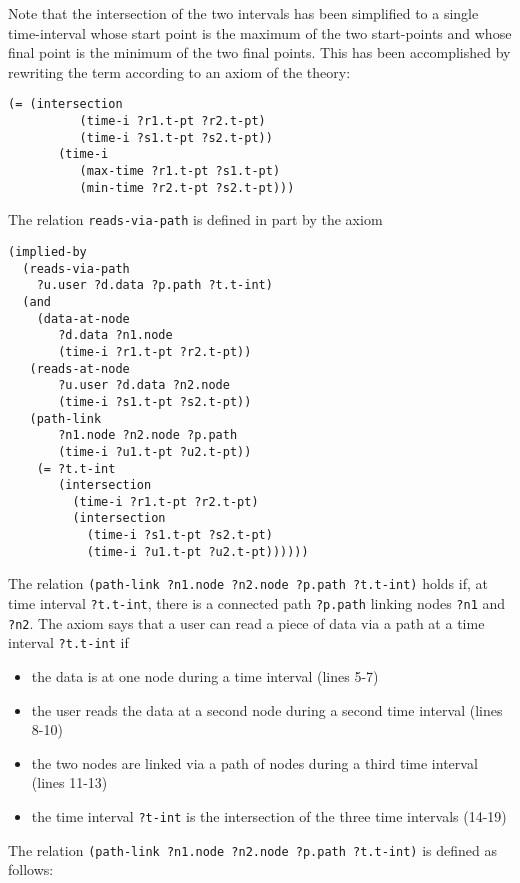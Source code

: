 Note that the intersection of the two intervals has been simplified to a single time-interval whose start point is the maximum of the two start-points and whose final point is the minimum of the two final points.  
This has been accomplished by rewriting the term according to an axiom of the theory:

\begin{lstlisting}[numbers=none]
 (= (intersection
          (time-i ?r1.t-pt ?r2.t-pt)
          (time-i ?s1.t-pt ?s2.t-pt))
       (time-i
          (max-time ?r1.t-pt ?s1.t-pt)
          (min-time ?r2.t-pt ?s2.t-pt)))
\end{lstlisting}


The relation \verb'reads-via-path' is defined in part by the axiom

\begin{lstlisting}
(implied-by
  (reads-via-path
    ?u.user ?d.data ?p.path ?t.t-int)
  (and
    (data-at-node 
       ?d.data ?n1.node 
       (time-i ?r1.t-pt ?r2.t-pt))
   (reads-at-node 
       ?u.user ?d.data ?n2.node 
       (time-i ?s1.t-pt ?s2.t-pt))
   (path-link 
       ?n1.node ?n2.node ?p.path 
       (time-i ?u1.t-pt ?u2.t-pt))   
    (= ?t.t-int
       (intersection
	     (time-i ?r1.t-pt ?r2.t-pt)
	     (intersection
           (time-i ?s1.t-pt ?s2.t-pt)
           (time-i ?u1.t-pt ?u2.t-pt))))))
\end{lstlisting}

The relation \verb'(path-link ?n1.node ?n2.node ?p.path ?t.t-int)' holds if, at time interval \verb'?t.t-int', there is a connected path \verb'?p.path' linking nodes \verb'?n1' and \verb'?n2'. 
The axiom says that a user can read a piece of data via a path at a time interval \verb'?t.t-int' if
\begin{itemize}
\item the data is at one node during a time interval (lines 5-7)
\item the user reads the data at a second node during a second time interval (lines 8-10)
\item the two nodes are linked via a path of nodes during a third time interval (lines 11-13)
\item the time interval \verb'?t-int' is the intersection of the three time intervals (14-19)
\end{itemize}

The relation \verb'(path-link ?n1.node ?n2.node ?p.path ?t.t-int)' is defined as follows:

